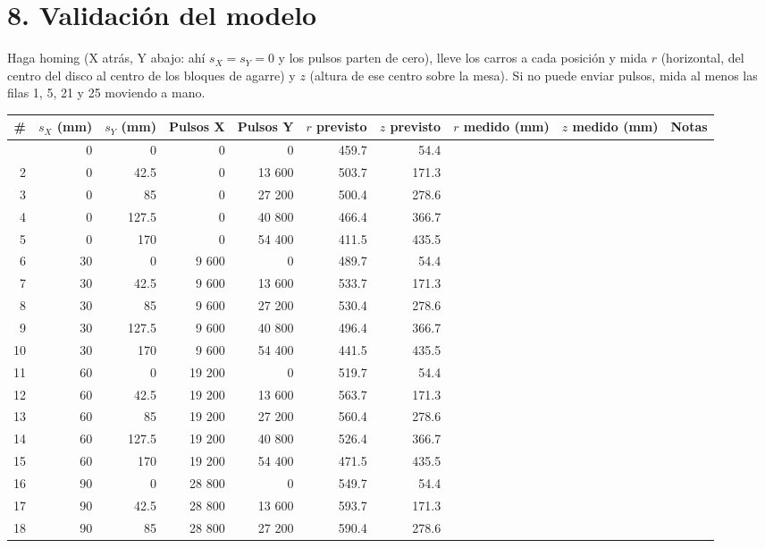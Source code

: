 \documentclass[10pt]{article}
\renewcommand{\arraystretch}{1.55}
\begin{document}
\section{8. Validación del modelo}
Haga homing (X atrás, Y abajo: ahí $s_X = s_Y = 0$ y los pulsos parten de cero), lleve los carros a cada posición y mida $r$ (horizontal, del centro del disco al
centro de los bloques de agarre) y $z$ (altura de ese centro sobre la mesa). Si no puede enviar pulsos, mida al menos las filas 1, 5, 21 y 25 moviendo a mano.
{\small\renewcommand{\arraystretch}{1.32}
\begin{longtable}{@{}rrrrrrr>{\columncolor{fondo}}p{2.6cm}>{\columncolor{fondo}}p{2.6cm}p{5.2cm}@{}}
\toprule
\textbf{\#} & \textbf{$s_X$ (mm)} & \textbf{$s_Y$ (mm)} & \textbf{Pulsos X} & \textbf{Pulsos Y} & \textbf{$r$ previsto} & \textbf{$z$ previsto} & \textbf{$r$ medido (mm)} & \textbf{$z$ medido (mm)} & \textbf{Notas}\\
\midrule\endhead
\bottomrule\endfoot
1 & 0 & 0 & 0 & 0 & 459.7 & 54.4 & & & \\
2 & 0 & 42.5 & 0 & 13 600 & 503.7 & 171.3 & & & \\
3 & 0 & 85 & 0 & 27 200 & 500.4 & 278.6 & & & \\
4 & 0 & 127.5 & 0 & 40 800 & 466.4 & 366.7 & & & \\
5 & 0 & 170 & 0 & 54 400 & 411.5 & 435.5 & & & \\
6 & 30 & 0 & 9 600 & 0 & 489.7 & 54.4 & & & \\
7 & 30 & 42.5 & 9 600 & 13 600 & 533.7 & 171.3 & & & \\
8 & 30 & 85 & 9 600 & 27 200 & 530.4 & 278.6 & & & \\
9 & 30 & 127.5 & 9 600 & 40 800 & 496.4 & 366.7 & & & \\
10 & 30 & 170 & 9 600 & 54 400 & 441.5 & 435.5 & & & \\
11 & 60 & 0 & 19 200 & 0 & 519.7 & 54.4 & & & \\
12 & 60 & 42.5 & 19 200 & 13 600 & 563.7 & 171.3 & & & \\
13 & 60 & 85 & 19 200 & 27 200 & 560.4 & 278.6 & & & \\
14 & 60 & 127.5 & 19 200 & 40 800 & 526.4 & 366.7 & & & \\
15 & 60 & 170 & 19 200 & 54 400 & 471.5 & 435.5 & & & \\
16 & 90 & 0 & 28 800 & 0 & 549.7 & 54.4 & & & \\
17 & 90 & 42.5 & 28 800 & 13 600 & 593.7 & 171.3 & & & \\
18 & 90 & 85 & 28 800 & 27 200 & 590.4 & 278.6 & & & \\

\end{longtable}}
\end{document}
